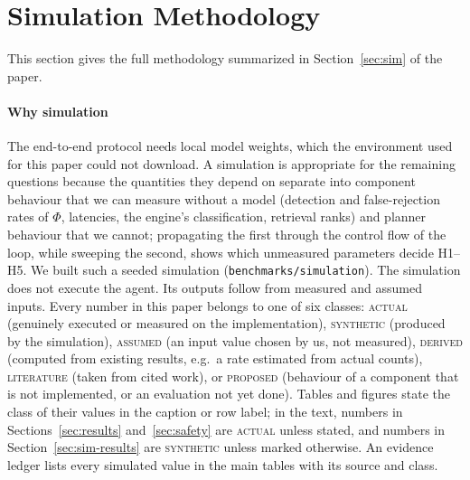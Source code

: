 \section{Simulation Methodology}
\label{sec:sim-full}

This section gives the full methodology summarized in Section~\ref{sec:sim} of the paper.

\paragraph{Why simulation} The end-to-end protocol needs local model weights, which the environment used for this paper could not download. A simulation is appropriate for the remaining questions because the quantities they depend on separate into component behaviour that we can measure without a model (detection and false-rejection rates of $\Phi$, latencies, the engine's classification, retrieval ranks) and planner behaviour that we cannot; propagating the first through the control flow of the loop, while sweeping the second, shows which unmeasured parameters decide H1--H5. We built such a seeded simulation (\texttt{benchmarks/simulation}). The simulation does not execute the agent. Its outputs follow from measured and assumed inputs. Every number in this paper belongs to one of six classes: \textsc{actual} (genuinely executed or measured on the implementation), \textsc{synthetic} (produced by the simulation), \textsc{assumed} (an input value chosen by us, not measured), \textsc{derived} (computed from existing results, e.g.\ a rate estimated from actual counts), \textsc{literature} (taken from cited work), or \textsc{proposed} (behaviour of a component that is not implemented, or an evaluation not yet done). Tables and figures state the class of their values in the caption or row label; in the text, numbers in Sections~\ref{sec:results} and~\ref{sec:safety} are \textsc{actual} unless stated, and numbers in Section~\ref{sec:sim-results} are \textsc{synthetic} unless marked otherwise. An evidence ledger lists every simulated value in the main tables with its source and class.

